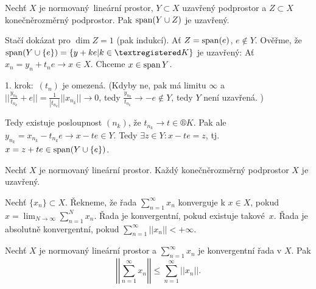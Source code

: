 \documentclass[12pt]{article}					%
\begin{document}
\begin{veta}
	Nechť $X$ je normovaný lineární prostor, $Y \subset X$ uzavřený podprostor a $Z \subset X$ konečněrozměrný podprostor. Pak $\operatorname{span}(Y \cup Z)$ je uzavřený.

	\begin{dukazin}
		Stačí dokázat pro $\dim Z = 1$ (pak indukcí). Ať $Z = \operatorname{span}(e)$, $e \notin Y$. Ověřme, že $\spn(Y \cup \{e\}) = \{y + ke | k \in ®K\}$ je uzavřený: Ať $x_n = y_n + t_n e \rightarrow x \in X$. Chceme $x \in \operatorname{span} Y$.

		1. krok: $(t_n)$ je omezená. (Kdyby ne, pak má limitu $∞$ a $||\frac{y_{n_k}}{t_{n_k}} + e || = \frac{1}{|t_{n_k}|} ||x_{n_k}|| \rightarrow 0$, tedy $\frac{y_{n_k}}{t_{n_k}} \rightarrow -e \notin Y$, tedy $Y$ není uzavřená. \lightning)

		Tedy existuje posloupnost $(n_k)$, že $t_{n_k} \rightarrow t \in ®K$. Pak ale $y_{n_k} = x_{n_k} - t_{n_k}e \rightarrow x - t e \in Y$. Tedy $\exists z \in Y: x - t e = z$, tj. $x = z + t e \in \operatorname{span}(Y \cup \{e\})$.
	\end{dukazin}
\end{veta}

\begin{dusledek}
	Nechť $X$ je normovaný lineární prostor. Každý konečněrozměrný podprostor $X$ je uzavřený.
\end{dusledek}


\begin{definice}
	Nechť $\{x_n\} \subset X$. Řekneme, že řada $\sum_{n=1}^∞ x_n$ konverguje k $x \in X$, pokud $x = {\displaystyle \lim_{N \rightarrow ∞}} \sum_{n=1}^N x_n$. Řada je konvergentní, pokud existuje takové $x$. Řada je absolutně konvergentní, pokud $\sum_{n=1}^∞ ||x_n|| < +∞$.
\end{definice}

\begin{poznamka}[Fakt]
	Nechť $X$ je normovaný lineární prostor a $\sum_{n = 1}^∞ x_n$ je konvergentní řada v $X$. Pak
	$$ \left|\left| \sum_{n=1}^∞ x_n \right|\right| ≤ \sum_{n=1}^∞ ||x_n||. $$
\end{poznamka}
\end{document}
